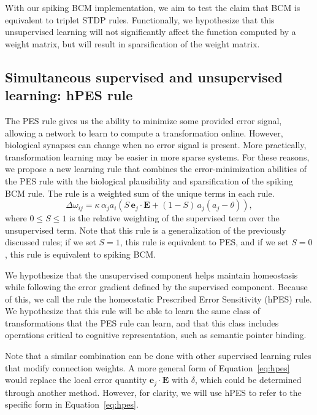 \documentclass[10pt,letterpaper]{article}
\begin{document}
With our spiking BCM implementation,
we aim to test the claim that BCM is equivalent
to triplet STDP rules.
Functionally, we hypothesize that
this unsupervised learning
will not significantly affect the function
computed by a weight matrix,
but will result in sparsification
of the weight matrix.

\subsection{Simultaneous supervised and unsupervised learning: hPES rule}

The PES rule gives us the ability to
minimize some provided error signal,
allowing a network to
learn to compute a transformation online.
However, biological synapses can change
when no error signal is present.
More practically,
transformation learning may be easier
in more sparse systems.
For these reasons, we propose a new learning rule
that combines the error-minimization abilities of the PES rule
with the biological plausibility and sparsification
of the spiking BCM rule.
The rule is a weighted sum of the
unique terms in each rule.
\begin{equation} \label{eq:hpes}
  \Delta \omega_{ij} = \kappa \, \alpha_j a_i \left(
    S \, \mathbf{e}_j \cdot \mathbf{E} + (1 - S) \, a_j(a_j - \theta) \right),
\end{equation}
where $0 \le S \le 1$ is the relative weighting of
the supervised term over the unsupervised term.
Note that this rule is a generalization
of the previously discussed rules;
if we set $S = 1$,
this rule is equivalent to PES, and
if we set $S = 0$,
this rule is equivalent to spiking BCM.

We hypothesize that the unsupervised
component helps maintain homeostasis
while following the error gradient defined
by the supervised component.
Because of this, we call the rule
the homeostatic Prescribed Error Sensitivity (hPES) rule.
We hypothesize that this rule will
be able to learn the same class
of transformations that the PES rule can learn,
and that this class includes operations
critical to cognitive representation,
such as semantic pointer binding.

Note that a similar combination can be done
with other supervised learning rules that
modify connection weights.
A more general form of Equation~\eqref{eq:hpes}
would replace the local error quantity
$\mathbf{e}_j \cdot \mathbf{E}$ with $\delta$,
which could be determined through another method.
However, for clarity, we will use hPES
to refer to the specific form in
Equation~\eqref{eq:hpes}.
\end{document}
